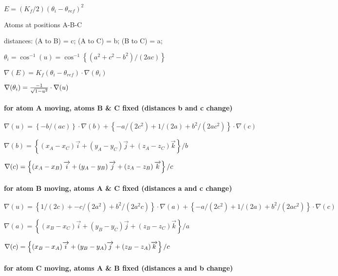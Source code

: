 $E=\left( K_{f}/2\right) \left( \theta _{i}-\theta _{ref}\right) ^{2}$

Atoms at positions A-B-C

distances: (A to B) = c; (A to C) = b; (B to C) = a;

$\theta _{i}=\cos ^{-1}(u)=\cos ^{-1}\left\{ \left( a^{2}+c^{2}-b^{2}\right)
/\left( 2ac\right) \right\} $

$\nabla (E)=K_{f}\left( \theta _{i}-\theta _{ref}\right) \cdot \nabla
(\theta _{i})$

$\nabla (\theta _{i})=\frac{-1}{\sqrt{1-u^{2}}}\cdot \nabla (u)\medskip $

\paragraph*{for atom A moving, atoms B \& C fixed (distances b and c
change)}

$\nabla (u)=\left\{ -b/\left( ac\right) \right\} \cdot \nabla (b)+\left\{
-a/\left( 2c^{2}\right) +1/\left( 2a\right) +b^{2}/\left( 2ac^{2}\right)
\right\} \cdot \nabla (c)$

$\nabla (b)=\left\{ \left( x_{A}-x_{C}\right) \overrightarrow{i}+\left(
y_{A}-y_{C}\right) \overrightarrow{j}+\left( z_{A}-z_{C}\right) 
\overrightarrow{k}\right\} /b$

$\nabla (c)=\left\{ \left( x_{A}-x_{B}\right) \overrightarrow{i}+\left(
y_{A}-y_{B}\right) \overrightarrow{j}+\left( z_{A}-z_{B}\right) 
\overrightarrow{k}\right\} /c\medskip $

\paragraph*{for atom B moving, atoms A \& C fixed (distances a and c
change)}

$\nabla (u)=\left\{ 1/(2c)+-c/(2a^{2})+b^{2}/(2a^{2}c)\right\} \cdot \nabla
(a)+\left\{ -a/\left( 2c^{2}\right) +1/(2a)+b^{2}/\left( 2ac^{2}\right)
\right\} \cdot \nabla (c)$

$\nabla (a)=\left\{ (x_{B}-x_{C})\overrightarrow{i}+(y_{B}-y_{C})%
\overrightarrow{j}+(z_{B}-z_{C})\overrightarrow{k}\right\} /a$

$\nabla (c)=\left\{ (x_{B}-x_{A})\overrightarrow{i}+(y_{B}-y_{A})%
\overrightarrow{j}+(z_{B}-z_{A})\overrightarrow{k}\right\} /c\medskip $

\paragraph*{for atom C moving, atoms A \& B fixed (distances a and b
change)}

